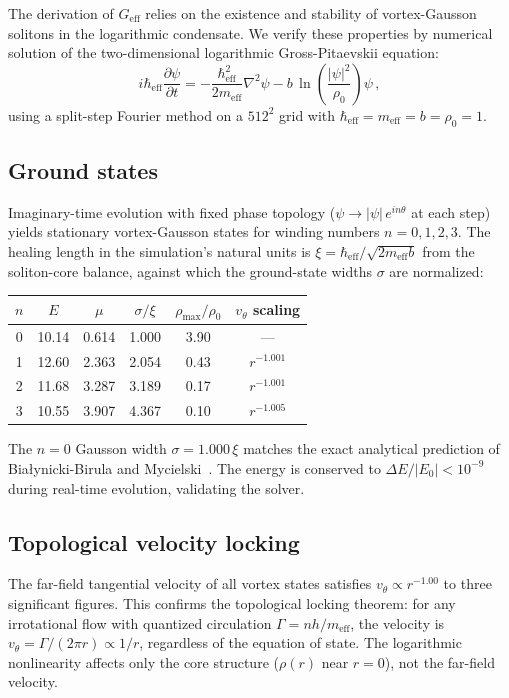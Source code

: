 \documentclass[12pt, a4paper]{article}
\newcommand{\Geff}{G_{\mathrm{eff}}}
\newcommand{\meff}{m_{\mathrm{eff}}}
\newcommand{\heff}{\hbar_{\mathrm{eff}}}
\begin{document}
The derivation of $\Geff$ relies on the existence and stability of vortex-Gausson solitons in the logarithmic condensate. We verify these properties by numerical solution of the two-dimensional logarithmic Gross-Pitaevskii equation:
\begin{equation}
    i\heff\frac{\partial\psi}{\partial t} = -\frac{\heff^2}{2\meff}\nabla^2\psi - b\,\ln\!\left(\frac{|\psi|^2}{\rho_0}\right)\psi\,,
\label{eq:gpe}
\end{equation}
using a split-step Fourier method on a $512^2$ grid with $\heff = \meff = b = \rho_0 = 1$.

\subsection{Ground states}

Imaginary-time evolution with fixed phase topology ($\psi \to |\psi|\,e^{in\theta}$ at each step) yields stationary vortex-Gausson states for winding numbers $n = 0, 1, 2, 3$. The healing length in the simulation's natural units is $\xi = \heff/\sqrt{2\meff b}$ from the soliton-core balance, against which the ground-state widths $\sigma$ are normalized:

\begin{center}
\begin{tabular}{cccccc}
\hline
$n$ & $E$ & $\mu$ & $\sigma/\xi$ & $\rho_{\max}/\rho_0$ & $v_\theta$ scaling \\
\hline
0 & 10.14 & 0.614 & 1.000 & 3.90 & --- \\
1 & 12.60 & 2.363 & 2.054 & 0.43 & $r^{-1.001}$ \\
2 & 11.68 & 3.287 & 3.189 & 0.17 & $r^{-1.001}$ \\
3 & 10.55 & 3.907 & 4.367 & 0.10 & $r^{-1.005}$ \\
\hline
\end{tabular}
\end{center}

The $n = 0$ Gausson width $\sigma = 1.000\,\xi$ matches the exact analytical prediction of Bia\l{}ynicki-Birula and Mycielski~\cite{bialynicki_birula_1979}. The energy is conserved to $\Delta E/|E_0| < 10^{-9}$ during real-time evolution, validating the solver.

\subsection{Topological velocity locking}

The far-field tangential velocity of all vortex states satisfies $v_\theta \propto r^{-1.00}$ to three significant figures. This confirms the topological locking theorem: for any irrotational flow with quantized circulation $\Gamma = n h/\meff$, the velocity is $v_\theta = \Gamma/(2\pi r) \propto 1/r$, regardless of the equation of state. The logarithmic nonlinearity affects only the core structure ($\rho(r)$ near $r = 0$), not the far-field velocity.
\end{document}
